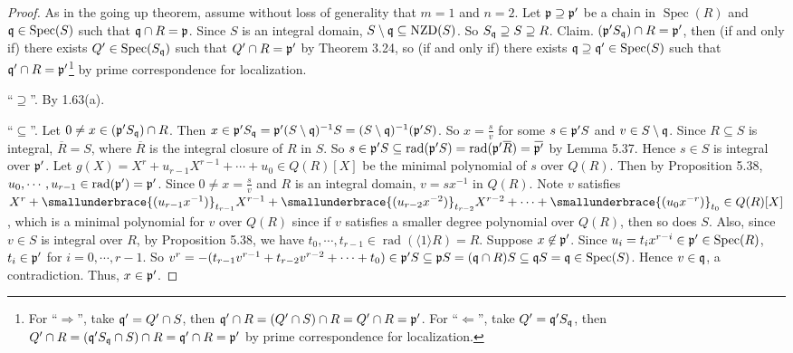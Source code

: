 \begin{proof}
    As in the going up theorem, assume without loss of generality that $m = 1$ and $n = 2$. Let $\mathfrak{p} \supseteq \mathfrak{p}'$ be a chain in $\operatorname{Spec}(R)$ and $\mathfrak{q} \in \operatorname{Spec}(S)$ such that $\mathfrak{q} \cap R = \mathfrak{p}$. Since $S$ is an integral domain, $S \setminus \mathfrak{q} \subseteq \operatorname{NZD}(S)$. So $S_{\mathfrak{q}} \supseteq S \supseteq R$. Claim. $(\mathfrak{p}'S_{\mathfrak{q}}) \cap R = \mathfrak{p}'$, then (if and only if) there exists $Q' \in \operatorname{Spec}(S_{\mathfrak{q}})$ such that $Q' \cap R = \mathfrak{p}'$ by Theorem 3.24, so (if and only if) there exists $\mathfrak{q} \supseteq \mathfrak{q}' \in \operatorname{Spec}(S)$ such that $\mathfrak{q}' \cap R = \mathfrak{p}'$\footnote[2]{For ``$\Rightarrow$'', take $\mathfrak{q}' = Q' \cap S$, then $\mathfrak{q}' \cap R = (Q' \cap S) \cap R = Q' \cap R = \mathfrak{p}'$. For ``$\Leftarrow$'', take $Q' = \mathfrak{q}' S_{\mathfrak{q}}$, then $Q' \cap R = (\mathfrak{q}'S_{\mathfrak{q}} \cap S) \cap R = \mathfrak{q}' \cap R = \mathfrak{p}'$ by prime correspondence for localization.} by prime correspondence for localization. \par
    ``$\supseteq$''. By 1.63(a). \par
    ``$\subseteq$''. Let $0 \neq x \in (\mathfrak{p}'S_{\mathfrak{q}}) \cap R$. Then $x \in \mathfrak{p}'S_{\mathfrak{q}} = \mathfrak{p}' (S \setminus \mathfrak{q})^{-1}S = (S \setminus \mathfrak{q})^{-1} (\mathfrak{p}'S)$. So $x = \frac{s}{v}$ for some $s \in \mathfrak{p}'S$ and $v \in S \setminus \mathfrak{q}$. Since $R \subseteq S$ is integral, $\overbar{R} = S$, where $\overbar{R}$ is the integral closure of $R$ in $S$. So $s \in \ffp'S \subseteq \operatorname{rad}(\ffp'S) = \operatorname{rad}(\ffp'\overbar{R}) = \overbar{\ffp'}$ by Lemma 5.37. Hence $s \in S$ is integral over $\mathfrak{p}'$. Let $g(X) = X^{r} + u_{r-1}X^{r-1} + \cdots + u_0 \in Q(R)[X]$ be the minimal polynomial of $s$ over $Q(R)$. Then by Proposition 5.38, $u_0,\cdots,u_{r-1} \in \operatorname{rad}(\mathfrak{p}') = \mathfrak{p}'$. Since $0 \neq x = \frac{s}{v}$ and $R$ is an integral domain, $v = sx^{-1}$ in $Q(R)$. Note $v$ satisfies $X^{r} + \smallunderbrace{(u_{r-1}x^{-1})}_{t_{r-1}} X^{r-1} + \smallunderbrace{(u_{r-2}x^{-2})}_{t_{r-2}}X^{r-2} + \cdots + \smallunderbrace{(u_0x^{-r})}_{t_0} \in Q(R)[X]$, which is a minimal polynomial for $v$ over $Q(R)$ since if $v$ satisfies a smaller degree polynomial over $Q(R)$, then so does $S$. Also, since $v \in S$ is integral over $R$, by Proposition 5.38, we have $t_0,\cdots,t_{r-1} \in \operatorname{rad}(\langle 1 \rangle R) = R$. Suppose $x \not\in \mathfrak{p}'$. Since $u_i = t_{i}x^{r-i} \in \mathfrak{p}' \in \operatorname{Spec}(R)$, $t_i \in \mathfrak{p}'$ for $i = 0,\cdots,r-1$. So $v^{r} = -(t_{r-1}v^{r-1} + t_{r-2}v^{r-2} + \cdots + t_0) \in \mathfrak{p}'S \subseteq \mathfrak{p} S = (\mathfrak{q} \cap R)S \subseteq \mathfrak{q} S = \mathfrak{q} \in \operatorname{Spec}(S)$. Hence $v \in \mathfrak{q}$, a contradiction. Thus, $x \in \mathfrak{p}'$.
\end{proof}

